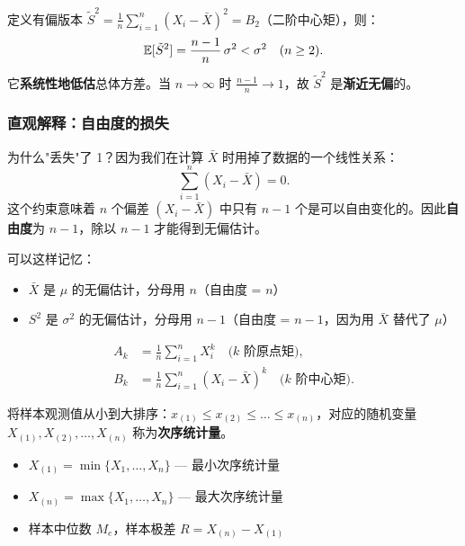 \begin{remark}[若用 $n$ 作分母]
定义有偏版本 $\tilde{S}^2 = \frac{1}{n}\sum_{i=1}^{n} (X_i - \bar{X})^2 = B_2$（二阶中心矩），则：
\begin{equation}
    \mathbb{E}[\tilde{S}^2] = \frac{n-1}{n}\,\sigma^2 < \sigma^2 \quad (n \ge 2).
\end{equation}
它\textbf{系统性地低估}总体方差。当 $n \to \infty$ 时 $\frac{n-1}{n} \to 1$，故 $\tilde{S}^2$ 是\textbf{渐近无偏}的。
\end{remark}

\subsubsection{直观解释：自由度的损失}

为什么"丢失"了 1？因为我们在计算 $\bar{X}$ 时用掉了数据的一个线性关系：
\begin{equation}
    \sum_{i=1}^{n} (X_i - \bar{X}) = 0.
\end{equation}
这个约束意味着 $n$ 个偏差 $(X_i - \bar{X})$ 中只有 $n-1$ 个是可以自由变化的。因此\textbf{自由度}为 $n-1$，除以 $n-1$ 才能得到无偏估计。

可以这样记忆：
\begin{itemize}
    \item $\bar{X}$ 是 $\mu$ 的无偏估计，分母用 $n$（自由度 = $n$）
    \item $S^2$ 是 $\sigma^2$ 的无偏估计，分母用 $n-1$（自由度 = $n-1$，因为用 $\bar{X}$ 替代了 $\mu$）
\end{itemize}

\begin{definition}[样本 $k$ 阶原点矩与中心矩]
\begin{align}
    A_k &= \frac{1}{n} \sum_{i=1}^{n} X_i^k \quad \text{($k$ 阶原点矩)}, \\
    B_k &= \frac{1}{n} \sum_{i=1}^{n} (X_i - \bar{X})^k \quad \text{($k$ 阶中心矩)}.
\end{align}
\end{definition}

\begin{definition}[次序统计量]
将样本观测值从小到大排序：$x_{(1)} \le x_{(2)} \le \dots \le x_{(n)}$，对应的随机变量
$X_{(1)}, X_{(2)}, \dots, X_{(n)}$ 称为\textbf{次序统计量}。
\begin{itemize}
    \item $X_{(1)} = \min\{X_1,\dots,X_n\}$ — 最小次序统计量
    \item $X_{(n)} = \max\{X_1,\dots,X_n\}$ — 最大次序统计量
    \item 样本中位数 $M_e$，样本极差 $R = X_{(n)} - X_{(1)}$
\end{itemize}
\end{definition}

